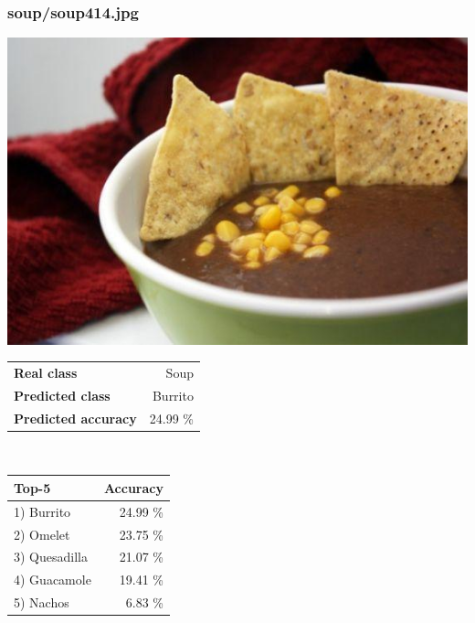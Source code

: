 \subsubsection{soup/soup414.jpg}

\begin{minipage}[t]{0.4\textwidth}
	\vspace{0pt}
	\includegraphics[width=\linewidth]{images/evaluation-images/soup/soup414.jpg}
\end{minipage}
\hfill
\begin{minipage}[t]{0.5\textwidth}
	\vspace{0pt}\raggedright
	\begin{tabularx}{\textwidth}{X r}
		\small \textbf{Real class} & \small Soup\\
		\small \textbf{Predicted class} & \small Burrito\\
		\small \textbf{Predicted accuracy} & \small 24.99 \%
    \end{tabularx}\\
    
    \vspace{6pt}
	\begin{tabularx}{\textwidth}{X r}
        \small \textbf{Top-5} & \small \textbf{Accuracy} \\
        \hline
		\small 1) Burrito & \small 24.99 \%\\\small 2) Omelet & \small 23.75 \%\\\small 3) Quesadilla & \small 21.07 \%\\\small 4) Guacamole & \small 19.41 \%\\\small 5) Nachos & \small 6.83 \%
    \end{tabularx}
\end{minipage}
    
